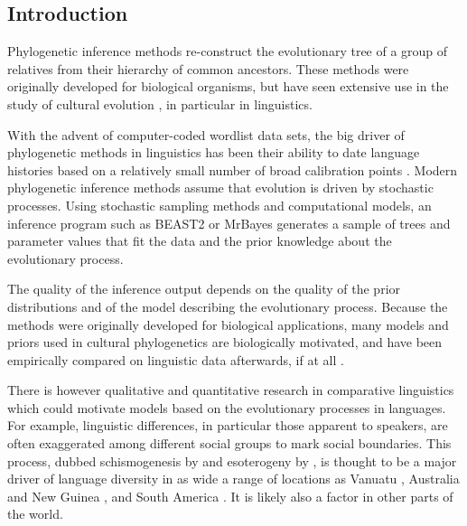\documentclass[]{rsos}%
\begin{document}
\begin{fmtext}
\section{Introduction}
Phylogenetic inference methods re-construct the evolu\-tionary tree of a group of
relatives from their hierarchy of common ancestors.
These methods were originally developed for biological organisms, but have seen extensive
use in the study of cultural evolution \parencite{evans2021uses}, in particular in
linguistics.
\end{fmtext}
\maketitle
With the advent of computer-coded wordlist data sets, the big driver of
phylogenetic methods in linguistics has been their ability to date language
histories based on a relatively small number of broad calibration points
\parencite{borchsenius2017phylogenetics}.
Modern phylogenetic inference methods assume that evolution is driven by
stochastic processes. Using stochastic sampling methods and computational models,
an inference program such as BEAST2 \parencite{drummond2015bayesian} or MrBayes \parencite{mrbayes}
generates a sample of trees and parameter values that fit the data and the prior knowledge
about the evolutionary process.

The quality of the inference output depends on the quality of the prior
distributions and of the model describing the evolutionary process. Because the
methods were originally developed for biological applications, many models and
priors used in cultural phylogenetics are biologically motivated, and have been
empirically compared on linguistic data afterwards, if at all
\parencite{kaiping2021systematic,rama2018three}.

There is however qualitative and quantitative research in comparative
linguistics which could motivate models based on the evolutionary processes in
languages. For example, linguistic differences, in particular those apparent to
speakers, are often exaggerated among different social groups to mark social
boundaries. This process, dubbed schismogenesis by \textcite{bateson1935culture}
and esoterogeny by \textcite{thurston1987processes}, is thought to be a major
driver of language diversity in as wide a range of locations as Vanuatu
\parencite{francois2011social}, Australia and New Guinea
\parencite{evans2019linguistic}, and South America
\parencite{epps2020amazonian}. It is likely also a factor in other parts of the
world.
\end{document}
